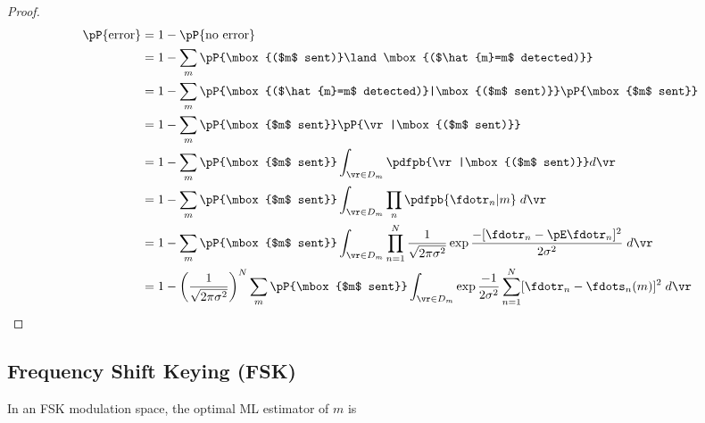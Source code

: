 {\begin{proof}
\begin{align*}
   \pP{\mbox{error}}
     &= 1 - \pP{\mbox{no error}}
   \\&= 1 - \sum_m \pP{\mbox{($m$ sent)}\land\mbox{($\hat{m}=m$ detected)}}
   \\&= 1 - \sum_m \pP{\mbox{($\hat{m}=m$ detected)}|\mbox{($m$ sent)}}
                    \pP{\mbox{$m$ sent}}
   \\&= 1 - \sum_m \pP{\mbox{$m$ sent}}
                    \pP{\vr |\mbox{($m$ sent)}}
   \\&= 1 - \sum_m \pP{\mbox{$m$ sent}}
                    \int_{\vr \in D_m}\pdfpb{\vr |\mbox{($m$ sent)}} d\vr 
   \\&= 1 - \sum_m \pP{\mbox{$m$ sent}}
                    \int_{\vr \in D_m} \prod_n \pdfpb{\fdotr_n|m} \;d\vr 
   \\&= 1 - \sum_m \pP{\mbox{$m$ sent}}
                    \int_{\vr \in D_m} \prod_{n=1}^N
                    \frac{1}{\sqrt{2\pi\sigma^2}}
                    \exp{\frac{-[\fdotr_n-\pE\fdotr_n]^2}{2\sigma^2}}
                    \;d\vr 
   \\&= 1 - \left( \frac{1}{\sqrt{2\pi\sigma^2}} \right)^N
         \sum_m \pP{\mbox{$m$ sent}}
         \int_{\vr \in D_m}
         \exp{\frac{-1}{2\sigma^2}
                   \sum_{n=1}^N [\fdotr_n-\fdots_n(m)]^2 }
         \;d\vr 
\end{align*}
\end{proof}



\subsection{Frequency Shift Keying (FSK)}
\begin{theorem}
In an FSK modulation space,
the optimal ML estimator of $m$ is
\end{theorem}

}
